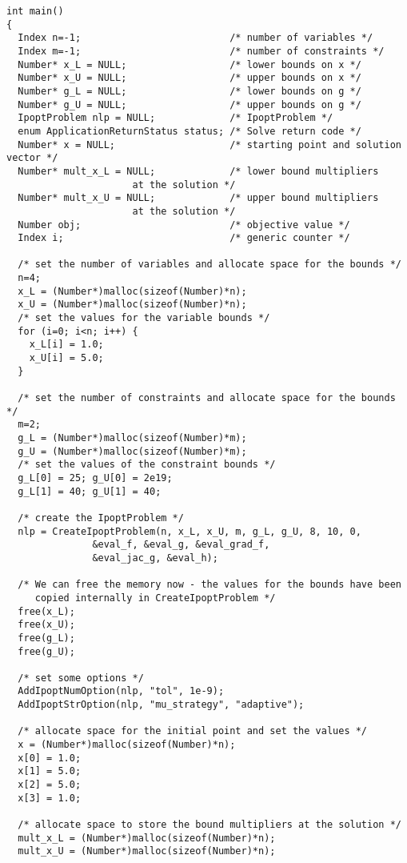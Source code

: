 \documentclass[letter,10pt]{article}
\begin{document}
\begin{footnotesize}
\begin{verbatim}
int main()
{
  Index n=-1;                          /* number of variables */
  Index m=-1;                          /* number of constraints */
  Number* x_L = NULL;                  /* lower bounds on x */
  Number* x_U = NULL;                  /* upper bounds on x */
  Number* g_L = NULL;                  /* lower bounds on g */
  Number* g_U = NULL;                  /* upper bounds on g */
  IpoptProblem nlp = NULL;             /* IpoptProblem */
  enum ApplicationReturnStatus status; /* Solve return code */
  Number* x = NULL;                    /* starting point and solution vector */
  Number* mult_x_L = NULL;             /* lower bound multipliers 
					  at the solution */
  Number* mult_x_U = NULL;             /* upper bound multipliers 
					  at the solution */
  Number obj;                          /* objective value */
  Index i;                             /* generic counter */
  
  /* set the number of variables and allocate space for the bounds */
  n=4;
  x_L = (Number*)malloc(sizeof(Number)*n);
  x_U = (Number*)malloc(sizeof(Number)*n);
  /* set the values for the variable bounds */
  for (i=0; i<n; i++) {
    x_L[i] = 1.0;
    x_U[i] = 5.0;
  }

  /* set the number of constraints and allocate space for the bounds */
  m=2;
  g_L = (Number*)malloc(sizeof(Number)*m);
  g_U = (Number*)malloc(sizeof(Number)*m);
  /* set the values of the constraint bounds */
  g_L[0] = 25; g_U[0] = 2e19;
  g_L[1] = 40; g_U[1] = 40;

  /* create the IpoptProblem */
  nlp = CreateIpoptProblem(n, x_L, x_U, m, g_L, g_U, 8, 10, 0, 
			   &eval_f, &eval_g, &eval_grad_f, 
			   &eval_jac_g, &eval_h);
  
  /* We can free the memory now - the values for the bounds have been
     copied internally in CreateIpoptProblem */
  free(x_L);
  free(x_U);
  free(g_L);
  free(g_U);

  /* set some options */
  AddIpoptNumOption(nlp, "tol", 1e-9);
  AddIpoptStrOption(nlp, "mu_strategy", "adaptive");

  /* allocate space for the initial point and set the values */
  x = (Number*)malloc(sizeof(Number)*n);
  x[0] = 1.0;
  x[1] = 5.0;
  x[2] = 5.0;
  x[3] = 1.0;

  /* allocate space to store the bound multipliers at the solution */
  mult_x_L = (Number*)malloc(sizeof(Number)*n);
  mult_x_U = (Number*)malloc(sizeof(Number)*n);


\end{verbatim}
\end{footnotesize}
\end{document}
